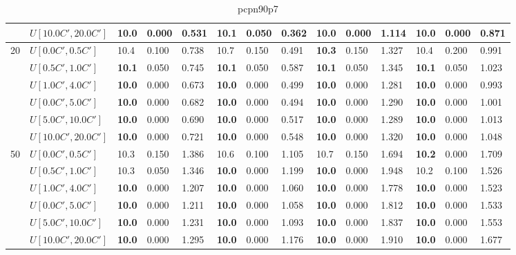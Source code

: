\begin{table}[h]
{\begin{tabular}{|l|l||l|l|l||l|l|l||l|l|l||l|l|l|}
       & $U[10.0C',20.0C']$ & \textbf{10.0} & 0.000 & 0.531 & 10.1 & 0.050 & 0.362 & \textbf{10.0} & 0.000 & 1.114 & \textbf{10.0} & 0.000 & 0.871 \\
      \hline\hline
      \multirow{6}{*}{20} & $U[0.0C',0.5C']$ & 10.4 & 0.100 & 0.738 & 10.7 & 0.150 & 0.491 & \textbf{10.3} & 0.150 & 1.327 & 10.4 & 0.200 & 0.991 \\
       & $U[0.5C',1.0C']$ & \textbf{10.1} & 0.050 & 0.745 & \textbf{10.1} & 0.050 & 0.587 & \textbf{10.1} & 0.050 & 1.345 & \textbf{10.1} & 0.050 & 1.023 \\
       & $U[1.0C',4.0C']$ & \textbf{10.0} & 0.000 & 0.673 & \textbf{10.0} & 0.000 & 0.499 & \textbf{10.0} & 0.000 & 1.281 & \textbf{10.0} & 0.000 & 0.993 \\
       & $U[0.0C',5.0C']$ & \textbf{10.0} & 0.000 & 0.682 & \textbf{10.0} & 0.000 & 0.494 & \textbf{10.0} & 0.000 & 1.290 & \textbf{10.0} & 0.000 & 1.001 \\
       & $U[5.0C',10.0C']$ & \textbf{10.0} & 0.000 & 0.690 & \textbf{10.0} & 0.000 & 0.517 & \textbf{10.0} & 0.000 & 1.289 & \textbf{10.0} & 0.000 & 1.013 \\
       & $U[10.0C',20.0C']$ & \textbf{10.0} & 0.000 & 0.721 & \textbf{10.0} & 0.000 & 0.548 & \textbf{10.0} & 0.000 & 1.320 & \textbf{10.0} & 0.000 & 1.048 \\
      \hline\hline
      \multirow{6}{*}{50} & $U[0.0C',0.5C']$ & 10.3 & 0.150 & 1.386 & 10.6 & 0.100 & 1.105 & 10.7 & 0.150 & 1.694 & \textbf{10.2} & 0.000 & 1.709 \\
       & $U[0.5C',1.0C']$ & 10.3 & 0.050 & 1.346 & \textbf{10.0} & 0.000 & 1.199 & \textbf{10.0} & 0.000 & 1.948 & 10.2 & 0.100 & 1.526 \\
       & $U[1.0C',4.0C']$ & \textbf{10.0} & 0.000 & 1.207 & \textbf{10.0} & 0.000 & 1.060 & \textbf{10.0} & 0.000 & 1.778 & \textbf{10.0} & 0.000 & 1.523 \\
       & $U[0.0C',5.0C']$ & \textbf{10.0} & 0.000 & 1.211 & \textbf{10.0} & 0.000 & 1.058 & \textbf{10.0} & 0.000 & 1.812 & \textbf{10.0} & 0.000 & 1.533 \\
       & $U[5.0C',10.0C']$ & \textbf{10.0} & 0.000 & 1.231 & \textbf{10.0} & 0.000 & 1.093 & \textbf{10.0} & 0.000 & 1.837 & \textbf{10.0} & 0.000 & 1.553 \\
       & $U[10.0C',20.0C']$ & \textbf{10.0} & 0.000 & 1.295 & \textbf{10.0} & 0.000 & 1.176 & \textbf{10.0} & 0.000 & 1.910 & \textbf{10.0} & 0.000 & 1.677 \\
      \hline
      \end{tabular}
      }
      \caption{pcpn90p7}
      \label{tab:pcpn90p7ILPVariant}\end{table}
      
